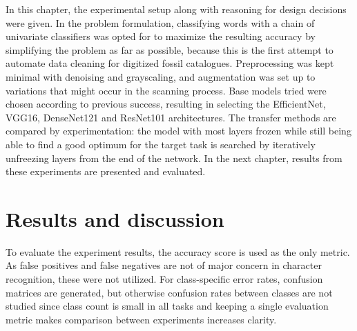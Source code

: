 \documentclass{article}
\begin{document}
In this chapter, the experimental setup along with reasoning for design decisions were given.
In the problem formulation, classifying words with a chain of univariate classifiers was opted for to 
maximize the resulting accuracy by simplifying the problem as far as possible, because this is the first attempt to 
automate data cleaning for digitized fossil catalogues. Preprocessing was kept minimal with denoising and grayscaling, 
and augmentation was set up to variations that might occur in the scanning process. Base models tried were 
chosen according to previous success, resulting in selecting the EfficientNet, VGG16, DenseNet121 and ResNet101 architectures.
The transfer methods are compared by experimentation: the model with most layers frozen while still being able to find a good optimum 
for the target task is searched by iteratively unfreezing layers from the end of the network. In the next chapter, 
results from these experiments are presented and evaluated.

\section{Results and discussion}


To evaluate the experiment results, the accuracy score is used as the only metric.
As false positives and false negatives are not of major concern in character recognition,
these were not utilized. For class-specific error rates, confusion matrices
are generated, but otherwise confusion rates between classes are not studied since class count 
is small in all tasks and keeping a single evaluation metric makes comparison between experiments 
increases clarity.
\end{document}
